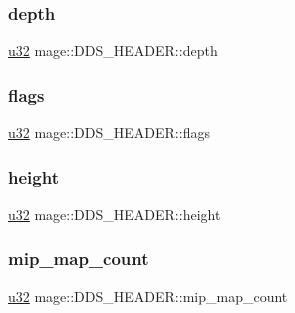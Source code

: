 \subsubsection{\texorpdfstring{depth}{depth}}
{\footnotesize\ttfamily \hyperlink{namespacemage_af2b398bf98eb10351f49cad73fe2cc73}{u32} mage\+::\+D\+D\+S\+\_\+\+H\+E\+A\+D\+E\+R\+::depth}

\hypertarget{structmage_1_1_d_d_s___h_e_a_d_e_r_a6ae07ec6497b125ecf92b4a0d0c23408}{}\label{structmage_1_1_d_d_s___h_e_a_d_e_r_a6ae07ec6497b125ecf92b4a0d0c23408} 
\subsubsection{\texorpdfstring{flags}{flags}}
{\footnotesize\ttfamily \hyperlink{namespacemage_af2b398bf98eb10351f49cad73fe2cc73}{u32} mage\+::\+D\+D\+S\+\_\+\+H\+E\+A\+D\+E\+R\+::flags}

\hypertarget{structmage_1_1_d_d_s___h_e_a_d_e_r_a8b8493634b29fca5ed026f4dac7cce77}{}\label{structmage_1_1_d_d_s___h_e_a_d_e_r_a8b8493634b29fca5ed026f4dac7cce77} 
\subsubsection{\texorpdfstring{height}{height}}
{\footnotesize\ttfamily \hyperlink{namespacemage_af2b398bf98eb10351f49cad73fe2cc73}{u32} mage\+::\+D\+D\+S\+\_\+\+H\+E\+A\+D\+E\+R\+::height}

\hypertarget{structmage_1_1_d_d_s___h_e_a_d_e_r_aaf20d8e249696371058a880b9f224a04}{}\label{structmage_1_1_d_d_s___h_e_a_d_e_r_aaf20d8e249696371058a880b9f224a04} 
\subsubsection{\texorpdfstring{mip\+\_\+map\+\_\+count}{mip\_map\_count}}
{\footnotesize\ttfamily \hyperlink{namespacemage_af2b398bf98eb10351f49cad73fe2cc73}{u32} mage\+::\+D\+D\+S\+\_\+\+H\+E\+A\+D\+E\+R\+::mip\+\_\+map\+\_\+count}

